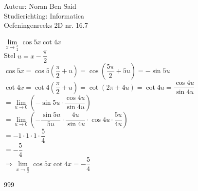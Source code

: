 \documentclass[a4paper]{article}
\begin{document}
\noindent \large Auteur: Noran Ben Said\\
\noindent \large Studierichting: Informatica\\
\noindent \large Oefeningenreeks 2D nr. 16.7 \\

\medskip
\normalsize

$ \lim\limits_{x \to \tfrac{\pi}{2}} \cos 5x \cot 4x$\\

Stel $ u = x - \dfrac{\pi}{2}$\\

$ \cos 5x = \cos 5 \left(\dfrac{\pi}{2} + u \right)
= \cos \left(\dfrac{5\pi}{2} + 5u \right)
= -\sin 5u$\\

$ \cot 4x = \cot 4 \left(\dfrac{\pi}{2} + u \right)
= \cot \left(2\pi + 4u \right)
= \cot 4u
= \dfrac{\cos 4u}{\sin 4u}$\\

$ = \lim\limits_{u \to 0} \left( -\sin 5u \cdot \dfrac{\cos 4u}{\sin 4u} \right)$\\

$ = \lim\limits_{u \to 0} \left(-\dfrac{\sin 5u}{5u} 
\cdot \dfrac{4u}{\sin 4u} \cdot \cos 4u \cdot \dfrac{5u}{4u} \right)$\\

$ = -1 \cdot 1 \cdot 1 \cdot \dfrac{5}{4}$\\

$ = -\dfrac{5}{4}$\\

$ \Rightarrow \lim\limits_{x \to \tfrac{\pi}{2}}
\cos 5x \cot 4x = -\dfrac{5}{4}$\\


\begin{thebibliography}{999}
\end{thebibliography}
\end{document}
